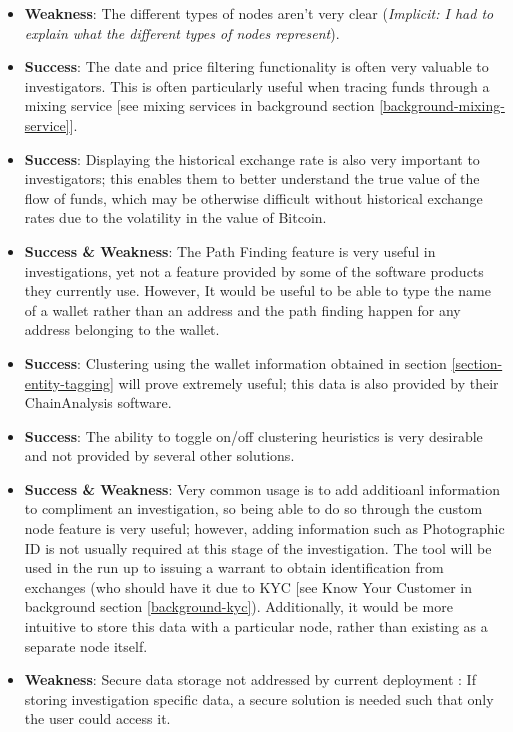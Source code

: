 \begin{itemize}
    \item \textbf{Weakness}: The different types of nodes aren't very clear (\textit{Implicit: I had to explain what the different types of nodes represent}).
    \item \textbf{Success}: The date and price filtering functionality is often very valuable to investigators. This is often particularly useful when tracing funds through a mixing service [see mixing services in background section \ref{background-mixing-service}]. 
    \item \textbf{Success}: Displaying the historical exchange rate is also very important to investigators; this enables them to better understand the true value of the flow of funds, which may be otherwise difficult without historical exchange rates due to the volatility in the value of Bitcoin. 
    \item \textbf{Success \& Weakness}: The Path Finding feature is very useful in investigations, yet not a feature provided by some of the software products they currently use. However, It would be useful to be able to type the name of a wallet rather than an address and the path finding happen for any address belonging to the wallet. 
    \item \textbf{Success}: Clustering using the wallet information obtained in section \ref{section-entity-tagging} will prove extremely useful; this data is also provided by their ChainAnalysis software. 
    \item \textbf{Success}: The ability to toggle on/off clustering heuristics is very desirable and not provided by several other solutions. 
    \item \textbf{Success \& Weakness}: Very common usage is to add additioanl information to compliment an investigation, so being able to do so through the custom node feature is very useful; however, adding information such as Photographic ID is not usually required at this stage of the investigation. The tool will be used in the run up to issuing a warrant to obtain identification from exchanges (who should have it due to KYC [see Know Your Customer in background section \ref{background-kyc}). Additionally, it would be more intuitive to store this data with a particular node, rather than existing as a separate node itself. 
    \item \textbf{Weakness}: Secure data storage not addressed by current deployment : If storing investigation specific data, a secure solution is needed such that only the user could access it. 
\end{itemize}


